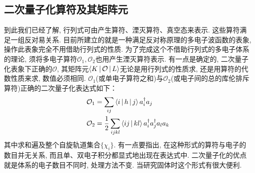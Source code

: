 \subsection{二次量子化算符及其矩阵元}
\label{sec2.4.2}
到此我们已经了解, 
行列式可由产生算符、湮灭算符、真空态来表示. 
这些算符满足一组反对易关系. 
目前所建立的就是一种满足反对称原理的多电子波函数的表象, 
操作此表象完全不用借助行列式的性质. 
为了完成这个不借助行列式的多电子体系的理论, 
须将多电子算符$\mathcal{O}_1,\mathcal{O}_2$也用产生湮灭算符表示. 
有一点是确定的, 
二次量子化表象下正确的$\mathcal{O}$, 
其矩阵元$\Braket{K|\mathcal{O}|L}$无论是用行列式的性质求, 
还是用算符的代数性质来求, 
数值必须相同. 
$\mathcal{O}_1$(或单电子算符之和)与$\mathcal{O}_2$(或电子间的总的库伦排斥算符)正确的二次量子化表达式如下：
\begin{align}
\mathcal{O}_1 & = \sum_{ij} \Braket{i|h|j}a^\dagger_ia_j\\
\mathcal{O}_2 & = \frac{1}{2}\sum_{ijkl}\Braket{ij|kl}a^\dagger_ia^\dagger_ja_la_k
\end{align}
其中求和遍及整个自旋轨道集合$\{\chi_i\}$. 
有一点要指出, 
在这种形式的算符与电子的数目并无关系, 
而且单、双电子积分都显式地出现在表达式中. 
二次量子化的优点就是体系的电子数目不同时, 
处理方法不变. 
当研究固体时这个形式有很大便利.

